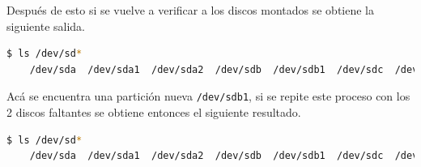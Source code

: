 \documentclass{article}
\begin{document}
Después de esto si se vuelve a verificar a los discos montados se obtiene la siguiente salida.

\begin{lstlisting}[style=mystyle,language=bash]
	$ ls /dev/sd*
	/dev/sda  /dev/sda1  /dev/sda2  /dev/sdb  /dev/sdb1  /dev/sdc  /dev/sdd
\end{lstlisting}

Acá se encuentra una partición nueva \texttt{/dev/sdb1}, si se repite este proceso con los 2 discos faltantes se obtiene entonces el siguiente resultado.

\begin{lstlisting}[style=mystyle,language=bash]
	$ ls /dev/sd*
	/dev/sda  /dev/sda1  /dev/sda2  /dev/sdb  /dev/sdb1  /dev/sdc  /dev/sdc1  /dev/sdd  /dev/sdd1
\end{lstlisting}
\end{document}
